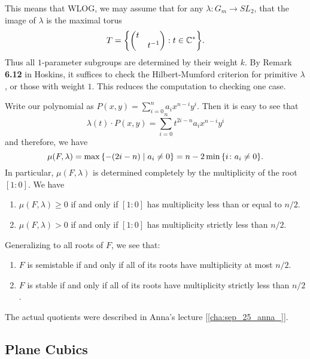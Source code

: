 \documentclass[leqno, openany]{memoir}
\theoremstyle{definition}
\theoremstyle{remark}
\theoremstyle{plain}
\theoremstyle{definition}
\theoremstyle{remark}
\newcommand{\C}{\mathbb{C}}
\begin{document}
This means that WLOG, we may assume that for any $\lambda \colon G_m \to SL_2$, that the image of $\lambda$ is the maximal torus
\[ T = \qty{ \mqty(\dmat{t,t^{-1}}) : t \in \C^* }. \]
Thus all $1$-parameter subgroups are determined by their weight $k$. By Remark \textbf{6.12} in Hoskins, it suffices to check the Hilbert-Mumford criterion for primitive $\lambda$, or those with weight $1$. This reduces the computation to checking one case.

Write our polynomial as $P(x,y) = \sum_{i=0}^n a_i x^{n-i} y^{i}$. Then it is easy to see that
\[ \lambda(t) \cdot P(x,y) = \sum_{i=0}^n t^{2i-n} a_i x^{n-i} y^{i} \]
and therefore, we have
\[ \mu(F, \lambda) = \max \qty{-(2i-n) \mid a_i \neq 0} = n - 2 \min \qty{i \colon a_i \neq 0}. \]
In particular, $\mu(F, \lambda)$ is determined completely by the multiplicity of the root $[1:0]$. We have
\begin{enumerate}
    \item $\mu(F, \lambda) \geq 0$ if and only if $[1:0]$ has multiplicity less than or equal to $n/2$.
    \item $\mu(F, \lambda) > 0$ if and only if $[1:0]$ has multiplicity strictly less than $n/2$.
\end{enumerate}
Generalizing to all roots of $F$, we see that:
\begin{enumerate}
    \item $F$ is semistable if and only if all of its roots have multiplicity at most $n/2$.
    \item $F$ is stable if and only if all of its roots have multiplicity strictly less than $n/2$.
\end{enumerate}
The actual quotients were described in Anna's lecture [\autoref{cha:sep_25_anna_}].

\subsection{Plane Cubics}%
\label{sub:plane_cubics}
\end{document}
